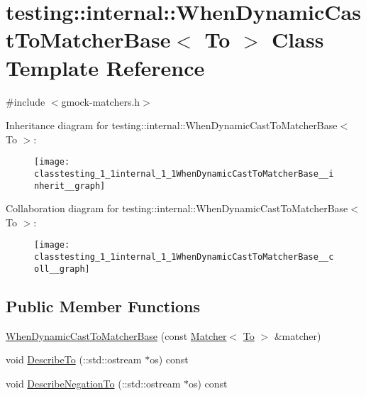\hypertarget{classtesting_1_1internal_1_1WhenDynamicCastToMatcherBase}{}\section{testing\+:\+:internal\+:\+:When\+Dynamic\+Cast\+To\+Matcher\+Base$<$ To $>$ Class Template Reference}
\label{classtesting_1_1internal_1_1WhenDynamicCastToMatcherBase}


{\ttfamily \#include $<$gmock-\/matchers.\+h$>$}



Inheritance diagram for testing\+:\+:internal\+:\+:When\+Dynamic\+Cast\+To\+Matcher\+Base$<$ To $>$\+:
\nopagebreak
\begin{figure}[H]
\begin{center}
\leavevmode
\texttt{[image: classtesting\_1\_1internal\_1\_1WhenDynamicCastToMatcherBase\_\_inherit\_\_graph]}
\end{center}
\end{figure}


Collaboration diagram for testing\+:\+:internal\+:\+:When\+Dynamic\+Cast\+To\+Matcher\+Base$<$ To $>$\+:
\nopagebreak
\begin{figure}[H]
\begin{center}
\leavevmode
\texttt{[image: classtesting\_1\_1internal\_1\_1WhenDynamicCastToMatcherBase\_\_coll\_\_graph]}
\end{center}
\end{figure}
\subsection*{Public Member Functions}
\begin{DoxyCompactItemize}
\item 
\hyperlink{classtesting_1_1internal_1_1WhenDynamicCastToMatcherBase_a7da2a4c7c43d5e18db0a3233a601c8ab}{When\+Dynamic\+Cast\+To\+Matcher\+Base} (const \hyperlink{classtesting_1_1Matcher}{Matcher}$<$ \hyperlink{classtesting_1_1internal_1_1To}{To} $>$ \&matcher)
\item 
void \hyperlink{classtesting_1_1internal_1_1WhenDynamicCastToMatcherBase_ac5726cb7b40862aabecce4d4d9c6f8b1}{Describe\+To} (\+::std\+::ostream $\ast$os) const 
\item 
void \hyperlink{classtesting_1_1internal_1_1WhenDynamicCastToMatcherBase_ac4f1370bc2db15a7242f06ea2e6309c2}{Describe\+Negation\+To} (\+::std\+::ostream $\ast$os) const 
\end{DoxyCompactItemize}
